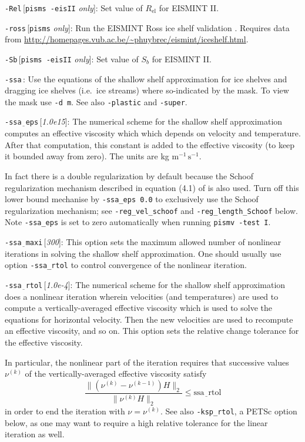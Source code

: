 \documentclass[11pt,final]{amsart}
\newcommand{\rawopt}[1]{\vspace{1mm}\noindent \large\texttt{-#1}\normalsize}
\newcommand{\opt}[1]{\rawopt{#1}\,:\quad}
\newcommand{\optdef}[2]{\rawopt{#1}\,[\textsl{#2}]:\quad}
\newcommand{\optrestrict}[2]{\rawopt{#1}\,[\texttt{#2} \textsl{only}]:\quad}
\newcommand{\und}{$\underline{\,\,\,}$}
\begin{document}
\optrestrict{Rel}{pisms -eisII}    Set value of $R_{\text{el}}$ for EISMINT II.

\optrestrict{ross}{pisms}    Run the EISMINT Ross ice shelf validation \cite{MacAyealetal}.  Requires data from \url{http://homepages.vub.ac.be/~phuybrec/eismint/iceshelf.html}.

\optrestrict{Sb}{pisms -eisII}    Set value of $S_b$ for EISMINT II.

\opt{ssa}  Use the equations of the shallow shelf approximation \cite{MacAyeal,Morland,SchoofStream,WeisGreveHutter} for ice shelves and dragging ice shelves (i.e.~ice streams) where so-indicated by the mask.  To view the mask use \verb|-d m|.  See also \verb|-plastic| and \verb|-super|.

\optdef{ssa\und eps}{1.0e15}  The numerical scheme for the shallow shelf approximation  \cite{WeisGreveHutter} computes an effective viscosity which which depends on velocity and temperature.  After that computation, this constant is added to the effective viscosity (to keep it bounded away from zero).  The units are kg $\text{m}^{-1}\,\text{s}^{-1}$. 

In fact there is a double regularization by default because the Schoof regularization mechanism described in equation (4.1) of \cite{SchoofStream} is also used.  Turn off this lower bound mechanise by \verb|-ssa_eps 0.0| to exclusively use the Schoof regularization mechanism; see \verb|-reg_vel_schoof| and \verb|-reg_length_Schoof| below.  Note \verb|-ssa_eps| is set to zero automatically when running \verb|pismv -test I|.

\optdef{ssa\und maxi}{300}  This option sets the maximum allowed number of nonlinear iterations in solving the shallow shelf approximation.  One should usually use option \verb|-ssa_rtol| to control convergence of the nonlinear iteration.

\optdef{ssa\und rtol}{1.0e-4}  The numerical scheme for the shallow shelf approximation \cite{WeisGreveHutter} does a nonlinear iteration wherein velocities (and temperatures) are used to compute a vertically-averaged effective viscosity which is used to solve the equations for horizontal velocity.  Then the new velocities are used to recompute an effective viscosity, and so on.  This option sets the relative change tolerance for the effective viscosity.

In particular, the nonlinear part of the iteration requires that successive values $\nu^{(k)}$ of the vertically-averaged effective viscosity satisfy
	$$\frac{\|(\nu^{(k)} - \nu^{(k-1)}) H\|_2}{\|\nu^{(k)} H\|_2} \le \text{ssa\und rtol}$$
in order to end the iteration with $\nu = \nu^{(k)}$.  See also \verb|-ksp_rtol|, a PETSc option below, as one may want to require a high relative tolerance for the linear iteration as well.
\end{document}
